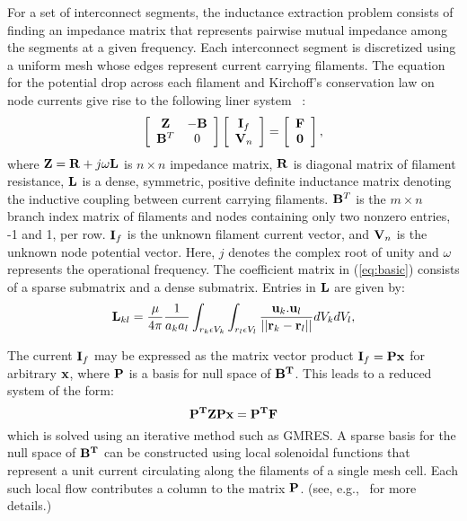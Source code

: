 \documentclass{report}
\begin{document}
For a set of interconnect segments, the inductance extraction problem
consists of finding an impedance matrix that represents pairwise mutual
impedance among the segments at a given frequency. Each interconnect
segment is discretized using a uniform mesh whose edges represent current
carrying filaments. The equation for the potential drop across each
filament and Kirchoff's conservation law on node currents give rise to
the following liner system ~\cite{fasthenry}:
\begin{equation}
\label{eq:basic}
\left[\begin{array}
{c c} {\bf Z} & -{\bf B}\\
{\bf B}^{T} & 0 \end{array} \right ]
\left[\begin{array}
{c}{\bf I}_f \\ {\bf V}_n
\end{array}
\right]
=
\left[\begin{array}
{c}{\bf F} \\
{\bf 0}
\end{array}
\right] ,
\end{equation}
where ${\bf Z} = {\bf R} + j\omega{\bf L}$ is $n \times n$ impedance
matrix, ${\bf R}$ is diagonal matrix of filament resistance, ${\bf L}$ is
a dense, symmetric, positive definite inductance matrix denoting the
inductive coupling between current carrying filaments. ${\bf B}^T$ is the
$m \times n$ branch index matrix of filaments and nodes containing only
two nonzero entries, -1 and 1, per row. ${\bf I}_f$ is the unknown
filament current vector, and ${\bf V}_n$ is the unknown node potential
vector. Here, $j$ denotes the complex root of unity and $\omega$
represents the operational frequency. The coefficient matrix in
(\ref{eq:basic}) consists of a sparse submatrix and a dense submatrix.
Entries in ${\bf L}$ are given by:
$$
{\bf L}_{kl}
=\frac{\mu}{4\pi}\frac{1}{a_{k}a_{l}}\int_{{r_k}\epsilon{V_k}}
\int_{{r_l}\epsilon{V_l}}\frac{{\bf u}_{k}{\bf .}{\bf u}_{l}}{||{\bf
r}_{k}
- {\bf r}_{l} ||} dV_{k}dV_{l},
$$

The current ${\bf I}_f$ may be expressed as the matrix vector product
${\bf I}_f = {\bf Px}$ for arbitrary ${\bf x}$, where ${\bf P}$ is a
basis for null space of ${\bf B^T}$. This leads to a reduced system of
the form:
\begin{equation}
\label{eq:reduced_system}
{\bf P^TZPx} = {\bf P^TF}
\end{equation}
which is solved using an iterative method such as GMRES. A sparse basis
for the null space of ${\bf B^T}$ can be constructed using local
solenoidal functions that represent a unit current circulating along the
filaments of a single mesh cell. Each such local flow contributes a
column to the matrix ${\bf P}$. (see, e.g.,~\cite{dac} for more details.)
\end{document}

